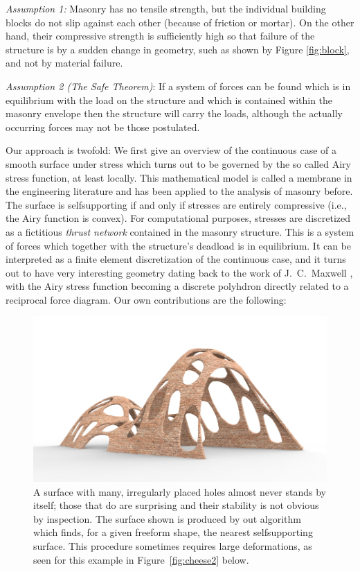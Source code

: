 \documentclass[annual]{acmsiggraph}
\begin{document}
{\it Assumption 1:} Masonry has no tensile strength, but the individual
building blocks do not slip against each other (because of friction or
mortar). On the other hand, their compressive strength is sufficiently
high so that failure of the structure is by a sudden change in geometry,
such as shown by Figure \ref{fig:block}, and not by material failure.

{\it Assumption 2 (The Safe Theorem)}: If a system of forces can be found
which is in equilibrium with the load on the structure and which is
contained within the masonry envelope then the structure will carry the
loads, although the actually occurring forces may not be those postulated.

Our approach is twofold: We first give an overview of the continuous case of a
smooth surface under stress which turns out to be governed by the so\dash
called Airy stress function, at least locally.
This mathematical model is called a
membrane in the engineering literature and has been applied to the
analysis of masonry before. The surface is self\dash supporting if and
only if stresses are entirely compressive (i.e., the Airy function is
convex). For computational purposes, stresses are discretized as a
fictitious {\em thrust network} \cite{Block07}
contained in the masonry structure.
This is a system of forces which together with the structure's deadload
is in equilibrium. It can be interpreted as a finite element discretization
of the continuous case, and it turns out to have very interesting geometry
dating back to the work of J.\ C.\ Maxwell , with the
Airy stress function becoming a discrete polyhdron directly
related to a reciprocal force diagram. 
Our own contributions are the following:


\begin{figure}[t]
\includegraphics[width=\columnwidth]{fig/cheesevault25.jpg}
\caption{A surface with many, irregularly placed holes almost never stands
by itself; those that do are surprising and their stability is not obvious
by inspection. The surface shown is produced by out algorithm which finds,
for a given freeform shape, the nearest self\dash supporting surface.
This procedure sometimes requires large deformations, as seen for
this example in Figure~\ref{fig:cheese2} below.}
	\label{fig:cheese}
\end{figure}
\end{document}
